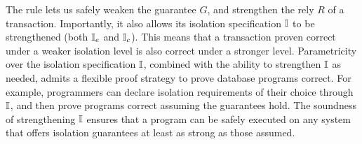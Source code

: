 
The  rule lets us safely weaken the guarantee
$G$, and strengthen the rely $R$ of a transaction. Importantly, it
also allows its isolation specification $\mathbb{I}$ to be strengthened (both
$\mathbb{I}_e$ and $\mathbb{I}_c$). This means that a transaction proven correct under
a weaker isolation level is also correct under a stronger level.
Parametricity over the isolation specification $\mathbb{I}$, combined with the
ability to strengthen $\mathbb{I}$ as needed, admits a flexible proof strategy
to prove database programs correct. For example, programmers can
declare isolation requirements of their choice through $\mathbb{I}$, and then
prove programs correct assuming the guarantees hold. The soundness of
strengthening $\mathbb{I}$ ensures that a program can be safely executed on
any system that offers isolation guarantees at least as strong as
those assumed.

